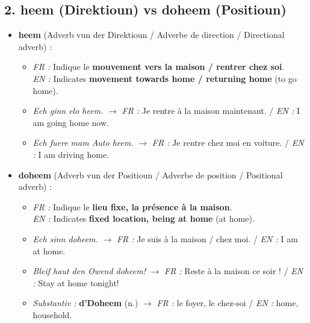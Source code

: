 \vspace{0.6em}

\subsection*{2. heem (Direktioun) vs doheem (Positioun)}

\begin{itemize}
    \item \textbf{heem} (Adverb vun der Direktioun / Adverbe de direction / Directional adverb) :
    \begin{itemize}
        \item \textit{FR :} Indique le \textbf{mouvement vers la maison / rentrer chez soi}. \\
        \textit{EN :} Indicates \textbf{movement towards home / returning home} (to go home).
        \item \textit{Ech ginn elo heem.} $\rightarrow$ \textit{FR :} Je rentre à la maison maintenant. / \textit{EN :} I am going home now.
        \item \textit{Ech fuere mam Auto heem.} $\rightarrow$ \textit{FR :} Je rentre chez moi en voiture. / \textit{EN :} I am driving home.
    \end{itemize}

    \vspace{0.4em}

    \item \textbf{doheem} (Adverb vun der Positioun / Adverbe de position / Positional adverb) :
    \begin{itemize}
        \item \textit{FR :} Indique le \textbf{lieu fixe, la présence à la maison}. \\
        \textit{EN :} Indicates \textbf{fixed location, being at home} (at home).
        \item \textit{Ech sinn doheem.} $\rightarrow$ \textit{FR :} Je suis à la maison / chez moi. / \textit{EN :} I am at home.
        \item \textit{Bleif haut den Owend doheem!} $\rightarrow$ \textit{FR :} Reste à la maison ce soir ! / \textit{EN :} Stay at home tonight!
        \item \textit{Substantiv :} \textbf{d'Doheem} (n.) $\rightarrow$ \textit{FR :} le foyer, le chez-soi / \textit{EN :} home, household.
    \end{itemize}
\end{itemize}

\vspace{1.5em}

